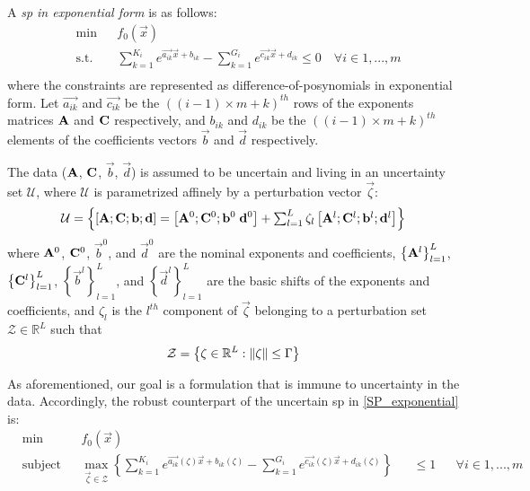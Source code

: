 A \emph{\gls{sp} in exponential form} is as follows:
\begin{equation}
    \label{SP_exponential}
\begin{aligned}
	& \min && f_0\left(\vec{x}\right) \\
	& \text{s.t.} && \textstyle{\sum}_{k=1}^{K_i}e^{\vec{a_{ik}}\vec{x} + b_{ik}} - \textstyle{\sum}_{k=1}^{G_i}e^{\vec{c_{ik}}\vec{x} + d_{ik}} \leq 0 \quad \forall i \in 1,...,m\\
\end{aligned}
\end{equation}
where the constraints are represented as difference-of-posynomials in exponential form.
Let $\vec{a_{ik}}$ and $\vec{c_{ik}}$ be the $((i-1)\times m + k)^{th}$ rows of the exponents matrices
$\mathbf{A}$ and $\mathbf{C}$ respectively, and $b_{ik}$ and $d_{ik}$ be the $((i-1)\times m + k)^{th}$ elements
of the coefficients vectors $\vec{b}$ and $\vec{d}$ respectively.

The data ($\mathbf{A}$, $\mathbf{C}$, $\vec{b}$, $\vec{d}$) is assumed to be uncertain and
living in an uncertainty set $\mathcal{U}$, where $\mathcal{U}$ is parametrized
affinely by a perturbation vector $\vec{\zeta}$:
\begin{equation}
\mathcal{U} = \left\{\left[\mathbf{A};\mathbf{C};\mathbf{b};\mathbf{d}\right] = \left[\mathbf{A}^0;\mathbf{C}^0;\mathbf{b}^0\;\mathbf{d}^0 \right] + \textstyle{\sum_{l=1}^{L}\zeta_l\left[\mathbf{A}^l;\mathbf{C}^l;\mathbf{b}^l; \mathbf{d}^l\right]}\right\}
\label{Data}
\end{equation}
where $\mathbf{A}^0$, $\mathbf{C}^0$, $\vec{b}^0$, and $\vec{d}^0$ are the nominal exponents and coefficients,
$\left\{\mathbf{A}^l\right\}_{l=1}^{L}$, $\left\{\mathbf{C}^l\right\}_{l=1}^{L}$, $\left\{\vec{b}^l\right\}_{l=1}^{L}$, and
$\left\{\vec{d}^l\right\}_{l=1}^{L}$ are the basic shifts of the exponents and coefficients,
and $\zeta_l$ is the $l^{th}$ component of $\vec{\zeta}$ belonging to a perturbation set $\mathcal{Z} \in \mathbb{R}^L$ such that
\begin{equation}
\mathcal{Z} = \left\{ \mathbf{\zeta} \in \mathbb{R}^L: \left\lVert\mathbf{\zeta}\right\rVert \leq \Gamma \right\}
\label{perturbation_set}
\end{equation}

As aforementioned, our goal is a formulation that is immune to
uncertainty in the data. Accordingly, the robust counterpart
of the uncertain \gls{sp} in \eqref{SP_exponential} is:
\begin{equation}
\begin{aligned}
& \min &&f_0\left(\vec{x}\right)\\
& \text{subject to} &&\max_{\vec{\zeta} \in \mathcal{Z}} \left\{\textstyle{\sum}_{k=1}^{K_i}e^{\vec{a_{ik}}\left(\zeta\right)\vec{x} + b_{ik}\left(\zeta\right)} - \textstyle{\sum}_{k=1}^{G_i}e^{\vec{c_{ik}}\left(\zeta\right)\vec{x} + d_{ik}\left(\zeta\right)}\right\} &&\leq 1 &&\forall i \in 1,...,m\\
\end{aligned}
\label{SP_counterparts_finite}
\end{equation}

